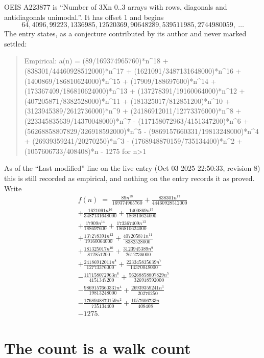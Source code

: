 \documentclass[11pt,a4paper]{article}
\theoremstyle{plain}
\theoremstyle{definition}
\begin{document}
OEIS A223877 is ``Number of 3Xn 0..3 arrays with rows, diagonals and antidiagonals unimodal.''. It has offset $1$ and begins
\[
64, 4096, 99223, 1336985, 12520369, 90648289, 539511985, 2744980059,\ \dots
\]
The entry states, as a conjecture contributed by its author and never marked settled:
\begin{quote}\raggedright\small
Empirical: a(n) = (89/169374965760)*n\^{}18 + (838301/44460928512000)*n\^{}17 + (1621091/3487131648000)*n\^{}16 + (1400869/186810624000)*n\^{}15 + (17909/188697600)*n\^{}14 + (173367409/186810624000)*n\^{}13 + (137278391/19160064000)*n\^{}12 + (407205871/8382528000)*n\^{}11 + (181325017/812851200)*n\^{}10 + (3123945389/2612736000)*n\^{}9 + (24186912011/12773376000)*n\^{}8 + (223345835639/14370048000)*n\^{}7 - (117158072963/4151347200)*n\^{}6 + (56268858807829/326918592000)*n\^{}5 - (9869157660331/19813248000)*n\^{}4 + (26939359241/20270250)*n\^{}3 - (1768948870159/735134400)*n\^{}2 + (1057606733/408408)*n - 1275 for n>1
\end{quote}
As of the ``Last modified'' line on the live entry (Oct 03 2025 22:50:33, revision 8) this is still
recorded as empirical, and nothing on the entry records it as proved. Write
\begin{multline*}
f(n)\;=\;\frac{89 n^{18}}{169374965760} + \frac{838301 n^{17}}{44460928512000} \\
+ \frac{1621091 n^{16}}{3487131648000} + \frac{1400869 n^{15}}{186810624000} \\
+ \frac{17909 n^{14}}{188697600} + \frac{173367409 n^{13}}{186810624000} \\
+ \frac{137278391 n^{12}}{19160064000} + \frac{407205871 n^{11}}{8382528000} \\
+ \frac{181325017 n^{10}}{812851200} + \frac{3123945389 n^{9}}{2612736000} \\
+ \frac{24186912011 n^{8}}{12773376000} + \frac{223345835639 n^{7}}{14370048000} \\
- \frac{117158072963 n^{6}}{4151347200} + \frac{56268858807829 n^{5}}{326918592000} \\
- \frac{9869157660331 n^{4}}{19813248000} + \frac{26939359241 n^{3}}{20270250} \\
- \frac{1768948870159 n^{2}}{735134400} + \frac{1057606733 n}{408408} \\
- 1275.
\end{multline*}

\section{The count is a walk count}
\end{document}
